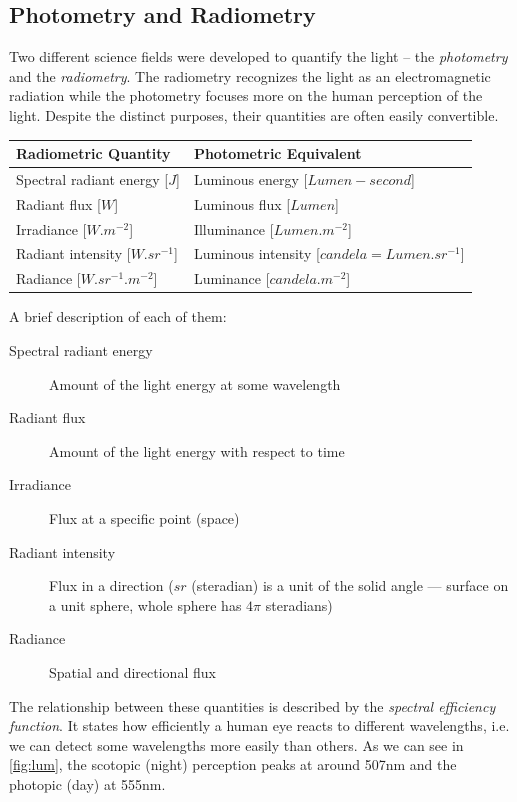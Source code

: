 \subsection{Photometry and Radiometry}

Two different science fields were developed to quantify the light -- the \emph{photometry} and the \emph{radiometry}. The radiometry recognizes the light as an electromagnetic radiation while the photometry focuses more on the human perception of the light. Despite the distinct purposes, their quantities are often easily convertible.

\begin{tabular}{ll}
	\hline
	\textbf{Radiometric Quantity} & \textbf{Photometric Equivalent} \\
	\hline \hline
	Spectral radiant energy [$J$] & Luminous energy [$Lumen-second$] \\
	\hline
	Radiant flux [$W$] & Luminous flux [$Lumen$] \\
	\hline
	Irradiance [$W.m^{-2}$] & Illuminance [$Lumen.m^{-2}$]  \\
	\hline
	Radiant intensity [$W.sr^{-1}$] & Luminous intensity [$candela=Lumen.sr^{-1}$] \\
	\hline
	Radiance [$W.sr^{-1}.m^{-2}$] & Luminance [$candela.m^{-2}$]
\end{tabular}
\bigbreak
A brief description of each of them:
\begin{description}
	\item[Spectral radiant energy] Amount of the light energy at some wavelength
	\item[Radiant flux] Amount of the light energy with respect to time
	\item[Irradiance] Flux at a specific point (space)
	\item[Radiant intensity] Flux in a direction ($sr$ (steradian) is a unit of the solid angle --- surface on a unit sphere, whole sphere has $4\pi$ steradians)
	\item[Radiance] Spatial and directional flux
\end{description}

The relationship between these quantities is described by the \emph{spectral efficiency function}. It states how efficiently a human eye reacts to different wavelengths, i.e. we can detect some wavelengths more easily than others. As we can see in \autoref{fig:lum}, the scotopic (night) perception peaks at around 507nm and the photopic (day) at 555nm.

